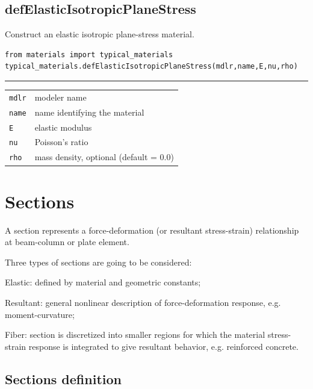 \subsection{defElasticIsotropicPlaneStress}
\noindent Construct an elastic isotropic plane-stress material.
\begin{verbatim}
from materials import typical_materials
typical_materials.defElasticIsotropicPlaneStress(mdlr,name,E,nu,rho)
\end{verbatim}
\vspace{-10pt}
{\color{grayLines} \rule{\linewidth}{0.25pt}}
\begin{center}
\begin{tabular}{lp{10cm}}
{\tt mdlr} & modeler name \\
{\tt name} & name identifying the material\\
{\tt E} & elastic modulus \\
{\tt nu} & Poisson's ratio \\
{\tt rho} &  mass density, optional (default = 0.0)\\
\end{tabular}
\end{center}
\section{Sections}
A section represents a force-deformation (or resultant stress-strain) relationship at beam-column or plate element.

Three types of sections are going to be considered:
\begin{description}
\item{Elastic:} defined by material and geometric constants;
\item{Resultant:} general nonlinear description of force-deformation response, e.g. moment-curvature;
\item{Fiber:} section is discretized into smaller regions for which the material stress-strain response is integrated to give resultant behavior, e.g. reinforced concrete.
\end{description}
\subsection{Sections definition}
